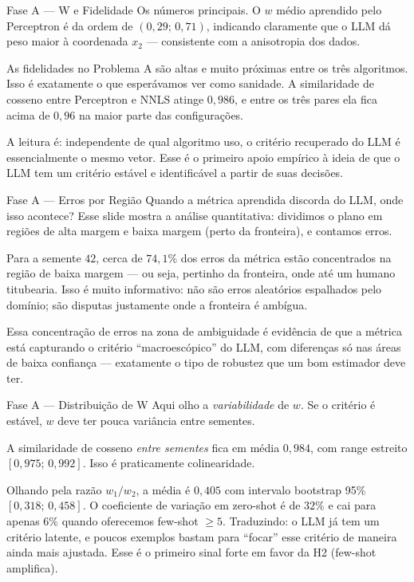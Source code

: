 \documentclass[aspectratio=169,10pt]{beamer}
\begin{document}
\begin{frame}{Fase A --- W e Fidelidade}
  \small
  Os n\'umeros principais. O $w$ m\'edio aprendido pelo Perceptron \'e da ordem de $(0{,}29;\,0{,}71)$,
  indicando claramente que o LLM d\'a peso maior \`a coordenada $x_2$ --- consistente com a anisotropia
  dos dados.
  \medskip

  As fidelidades no Problema A s\~ao altas e muito pr\'oximas entre os tr\^es algoritmos. Isso \'e
  exatamente o que esper\'avamos ver como sanidade. A similaridade de cosseno entre Perceptron e NNLS
  atinge $0{,}986$, e entre os tr\^es pares ela fica acima de $0{,}96$ na maior parte das configura\c{c}\~oes.
  \medskip

  A leitura \'e: independente de qual algoritmo uso, o crit\'erio recuperado do LLM \'e essencialmente
  o mesmo vetor. Esse \'e o primeiro apoio emp\'irico \`a ideia de que o LLM tem um crit\'erio est\'avel
  e identific\'avel a partir de suas decis\~oes.
\end{frame}

\begin{frame}{Fase A --- Erros por Regi\~ao}
  \small
  Quando a m\'etrica aprendida discorda do LLM, onde isso acontece? Esse slide mostra a an\'alise
  quantitativa: dividimos o plano em regi\~oes de alta margem e baixa margem (perto da fronteira), e
  contamos erros.
  \medskip

  Para a semente $42$, cerca de $74{,}1\%$ dos erros da m\'etrica est\~ao concentrados na regi\~ao de
  baixa margem --- ou seja, pertinho da fronteira, onde at\'e um humano titubearia. Isso \'e muito
  informativo: n\~ao s\~ao erros aleat\'orios espalhados pelo dom\'inio; s\~ao disputas justamente onde
  a fronteira \'e amb\'igua.
  \medskip

  Essa concentra\c{c}\~ao de erros na zona de ambiguidade \'e evid\^encia de que a m\'etrica est\'a
  capturando o crit\'erio ``macroesc\'opico'' do LLM, com dife\-ren\c{c}as s\'o nas \'areas de baixa
  confian\c{c}a --- exatamente o tipo de robustez que um bom estimador deve ter.
\end{frame}

\begin{frame}{Fase A --- Distribui\c{c}\~ao de W}
  \small
  Aqui olho a \emph{variabilidade} de $w$. Se o crit\'erio \'e est\'avel, $w$ deve ter pouca vari\^ancia
  entre sementes.
  \medskip

  A similaridade de cosseno \emph{entre sementes} fica em m\'edia $0{,}984$, com range estreito
  $[0{,}975;\,0{,}992]$. Isso \'e praticamente colinearidade.
  \medskip

  Olhando pela raz\~ao $w_1/w_2$, a m\'edia \'e $0{,}405$ com intervalo bootstrap 95\% $[0{,}318;\,0{,}458]$.
  O coeficiente de varia\c{c}\~ao em zero-shot \'e de $32\%$ e cai para apenas $6\%$ quando
  oferecemos few-shot $\geq 5$. Traduzindo: o LLM j\'a tem um crit\'erio latente, e poucos exemplos bastam
  para ``focar'' esse crit\'erio de maneira ainda mais ajustada. Esse \'e o primeiro sinal forte
  em favor da H2 (few-shot amplifica).
\end{frame}
\end{document}
